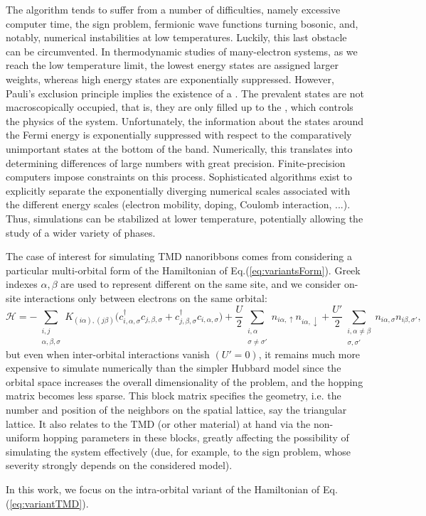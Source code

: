 The algorithm tends to suffer from a number of difficulties, namely excessive computer time, the sign problem, fermionic wave functions turning bosonic, and, notably,  numerical instabilities at low temperatures.
Luckily, this last obstacle can be circumvented.
In thermodynamic studies of many-electron systems, as we reach the low temperature limit, the lowest energy states are assigned larger weights, whereas high energy states are exponentially suppressed.
However, Pauli's exclusion principle implies the existence of a .
The prevalent states are not macroscopically occupied, that is, they are only filled up to the , which controls the physics of the system.
Unfortunately, the information about the states around the Fermi energy is exponentially suppressed with respect to the comparatively unimportant states at the bottom of the band.
Numerically, this translates into determining differences of large numbers with great precision.
Finite-precision computers impose constraints on this process.
Sophisticated algorithms exist to explicitly separate the exponentially diverging numerical scales associated with the different energy scales (electron mobility, doping, Coulomb interaction, ...).
Thus, simulations can be stabilized at lower temperature, potentially allowing the study of a wider variety of phases.

The case of interest for simulating \acs{TMD} nanoribbons comes from considering a particular multi-orbital form of the Hamiltonian of Eq.(\ref{eq:variantsForm}).
Greek indexes $\alpha, \beta$ are used to represent different  on the same site, and we consider on-site  interactions only between electrons on the same orbital:
\begin{equation}\label{eq:variantTMD}
\mathcal{H} = - \sum_{\substack{i, j \\ \alpha, \beta, \sigma}} K_{(i\alpha),(j\beta )} \bigg( c_{i,\alpha, \sigma}^\dagger c_{j,\beta, \sigma} + c_{j,\beta , \sigma}^\dagger c_{i,\alpha, \sigma} \bigg) + \frac{U}{2} \sum_{\substack{i, \alpha \\ \sigma \neq \sigma'} } n_{i\alpha, \uparrow} n_{i\alpha, \downarrow} + \frac{U'}{2} \sum_{\substack{i, \alpha \neq \beta \\ \sigma, \sigma'}} n_{i\alpha, \sigma} n_{i\beta, \sigma'} ,
\end{equation}
but even when inter-orbital interactions vanish $(U' = 0)$, it remains much more expensive to simulate numerically than the simpler Hubbard model since the orbital space increases the overall dimensionality of the problem, and the hopping matrix becomes less sparse.
This block matrix specifies the geometry, i.e. the number and position of the neighbors on the spatial lattice, say the triangular lattice.
It also relates to the \acs{TMD} (or other material) at hand via the non-uniform hopping parameters in these blocks, greatly affecting the possibility of simulating the system effectively (due, for example, to the sign problem, whose severity strongly depends on the considered model).

In this work, we focus on the intra-orbital variant of the Hamiltonian of Eq.(\ref{eq:variantTMD}).